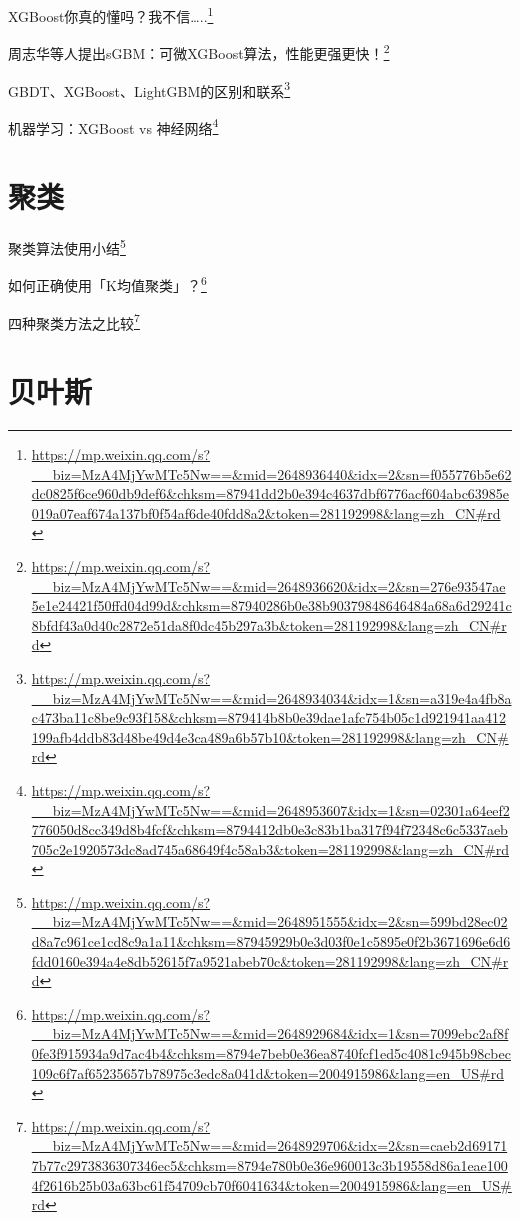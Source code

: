 \documentclass[]{ctexbook}
\renewcommand{\href}[2]{#2\footnote{\url{#1}}}
\begin{document}
\href{https://mp.weixin.qq.com/s?__biz=MzA4MjYwMTc5Nw==\&mid=2648936440\&idx=2\&sn=f055776b5e62dc0825f6ce960db9def6\&chksm=87941dd2b0e394c4637dbf6776acf604abc63985e019a07eaf674a137bf0f54af6de40fdd8a2\&token=281192998\&lang=zh_CN\#rd}{XGBoost你真的懂吗？我不信\ldots{}..}

\href{https://mp.weixin.qq.com/s?__biz=MzA4MjYwMTc5Nw==\&mid=2648936620\&idx=2\&sn=276e93547ae5e1e24421f50ffd04d99d\&chksm=87940286b0e38b90379848646484a68a6d29241c8bfdf43a0d40c2872e51da8f0dc45b297a3b\&token=281192998\&lang=zh_CN\#rd}{周志华等人提出sGBM：可微XGBoost算法，性能更强更快！}

\href{https://mp.weixin.qq.com/s?__biz=MzA4MjYwMTc5Nw==\&mid=2648934034\&idx=1\&sn=a319e4a4fb8ac473ba11c8be9c93f158\&chksm=879414b8b0e39dae1afc754b05c1d921941aa412199afb4ddb83d48be49d4e3ca489a6b57b10\&token=281192998\&lang=zh_CN\#rd}{GBDT、XGBoost、LightGBM的区别和联系}

\href{https://mp.weixin.qq.com/s?__biz=MzA4MjYwMTc5Nw==\&mid=2648953607\&idx=1\&sn=02301a64eef2776050d8cc349d8b4fcf\&chksm=8794412db0e3c83b1ba317f94f72348c6c5337aeb705c2e1920573dc8ad745a68649f4c58ab3\&token=281192998\&lang=zh_CN\#rd}{机器学习：XGBoost vs 神经网络}

\hypertarget{ux805aux7c7b}{%
\section{聚类}\label{ux805aux7c7b}}

\href{https://mp.weixin.qq.com/s?__biz=MzA4MjYwMTc5Nw==\&mid=2648951555\&idx=2\&sn=599bd28ec02d8a7c961ce1cd8c9a1a11\&chksm=87945929b0e3d03f0e1c5895e0f2b3671696e6d6fdd0160e394a4e8db52615f7a9521abeb70c\&token=281192998\&lang=zh_CN\#rd}{聚类算法使用小结}

\href{https://mp.weixin.qq.com/s?__biz=MzA4MjYwMTc5Nw==\&mid=2648929684\&idx=1\&sn=7099ebc2af8f0fe3f915934a9d7ac4b4\&chksm=8794e7beb0e36ea8740fcf1ed5c4081c945b98cbec109c6f7af65235657b78975c3edc8a041d\&token=2004915986\&lang=en_US\#rd}{如何正确使用「K均值聚类」？}

\href{https://mp.weixin.qq.com/s?__biz=MzA4MjYwMTc5Nw==\&mid=2648929706\&idx=2\&sn=caeb2d691717b77c2973836307346ec5\&chksm=8794e780b0e36e960013c3b19558d86a1eae1004f2616b25b03a63bc61f54709cb70f6041634\&token=2004915986\&lang=en_US\#rd}{四种聚类方法之比较}

\hypertarget{ux8d1dux53f6ux65af}{%
\section{贝叶斯}\label{ux8d1dux53f6ux65af}}
\end{document}
